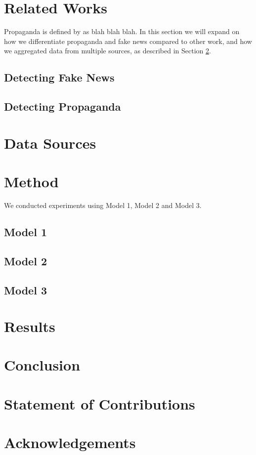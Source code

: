 \documentclass[11pt]{article}
\begin{document}
\section{Related Works}
Propaganda is defined by \cite{blah} as blah blah blah. In this section we will expand on how we differentiate propaganda and fake news compared to other work, and how we aggregated data from multiple sources, as described in Section \ref{data}.
\subsection{Detecting Fake News}



\subsection{Detecting Propaganda}

\section{Data Sources}
\label{data}


\section{Method}
We conducted experiments using Model 1, Model 2 and Model 3.

\subsection{Model 1}
\subsection{Model 2}
\subsection{Model 3}



\section{Results}



\section{Conclusion}



\section*{Statement of Contributions}

\section* {Acknowledgements}


%
%



\end{document}
